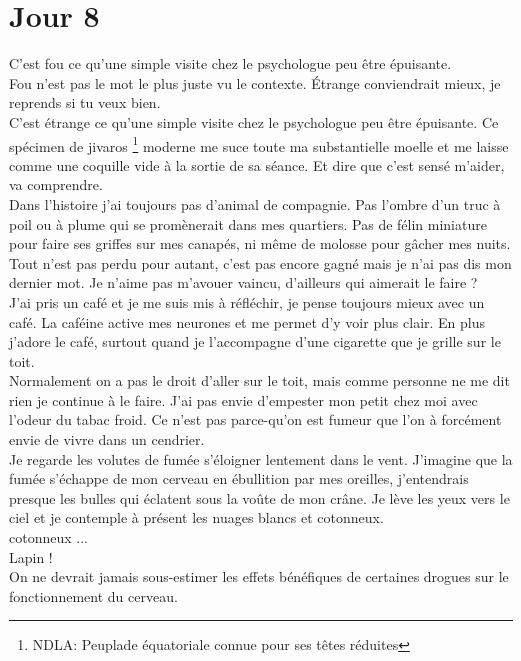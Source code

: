 \chapter*{Jour 8}
C'est fou ce qu'une simple visite chez le psychologue peu être épuisante. \\

Fou n'est pas le mot le plus juste vu le contexte. Étrange conviendrait mieux, je reprends si tu veux bien.  \\
C'est étrange ce qu'une simple visite chez le psychologue peu être épuisante. Ce spécimen de jivaros \footnote{NDLA: Peuplade équatoriale connue pour ses têtes réduites} moderne me suce toute ma substantielle moelle et me laisse comme une coquille vide à la sortie de sa séance. Et dire que c'est sensé m'aider, va comprendre. \\

Dans l'histoire j'ai toujours pas d'animal de compagnie. Pas l'ombre d'un truc à poil ou à plume qui se promènerait dans mes quartiers. Pas de félin miniature pour faire ses griffes sur mes canapés, ni même de molosse pour gâcher mes nuits. \\

Tout n'est pas perdu pour autant, c'est pas encore gagné mais je n'ai pas dis mon dernier mot. Je n'aime pas m'avouer vaincu, d'ailleurs qui aimerait le faire ? \\

J'ai pris un café et je me suis mis à réfléchir, je pense toujours mieux avec un café. La caféine active mes neurones et me permet d'y voir plus clair. En plus j'adore le café, surtout quand je l'accompagne d'une cigarette que je grille sur le toit. \\
Normalement on a pas le droit d'aller sur le toit, mais comme personne ne me dit rien je continue à le faire. J'ai pas envie d'empester mon petit chez moi avec l'odeur du tabac froid. Ce n'est pas parce-qu'on est fumeur que l'on à forcément envie de vivre dans un cendrier.\\
Je regarde les volutes de fumée s'éloigner lentement dans le vent. J'imagine que la fumée s'échappe de mon cerveau en ébullition par mes oreilles, j'entendrais presque les bulles qui éclatent sous la voûte de mon crâne. Je lève les yeux vers le ciel et je contemple à présent les nuages blancs et cotonneux. \\
cotonneux ... \\
Lapin ! \\

On ne devrait jamais sous-estimer les effets bénéfiques de certaines drogues sur le fonctionnement du cerveau. \\

